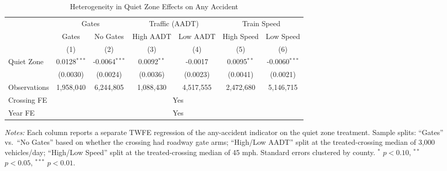 \begin{table}[t]
\centering
\caption{Heterogeneity in Quiet Zone Effects on Any Accident}
\label{tab:heterogeneity}
\begin{adjustbox}{max width=\textwidth}
\begin{tabular}{lcccccc}
\hline\hline
 & \multicolumn{2}{c}{Gates} & \multicolumn{2}{c}{Traffic (AADT)} & \multicolumn{2}{c}{Train Speed} \\
\cmidrule(lr){2-3} \cmidrule(lr){4-5} \cmidrule(lr){6-7}
 & Gates & No Gates & High AADT & Low AADT & High Speed & Low Speed \\
 & (1) & (2) & (3) & (4) & (5) & (6) \\
\hline
\addlinespace
Quiet Zone & 0.0128$^{***}$ & -0.0064$^{***}$ & 0.0092$^{**}$ & -0.0017 & 0.0095$^{**}$ & -0.0060$^{***}$ \\
 & (0.0030) & (0.0024) & (0.0036) & (0.0023) & (0.0041) & (0.0021) \\
\addlinespace
\hline
Observations & 1,958,040 & 6,244,805 & 1,088,430 & 4,517,555 & 2,472,680 & 5,146,715 \\
Crossing FE & \multicolumn{6}{c}{Yes} \\
Year FE & \multicolumn{6}{c}{Yes} \\
\hline\hline
\end{tabular}
\end{adjustbox}
\par\vspace{0.3em}
\begin{minipage}{\textwidth}
\footnotesize
\textit{Notes:} Each column reports a separate TWFE regression of the any-accident indicator on the quiet zone treatment. Sample splits: ``Gates'' vs.\ ``No Gates'' based on whether the crossing had roadway gate arms; ``High/Low AADT'' split at the treated-crossing median of 3,000 vehicles/day; ``High/Low Speed'' split at the treated-crossing median of 45 mph. Standard errors clustered by county. $^{*}$ $p < 0.10$, $^{**}$ $p < 0.05$, $^{***}$ $p < 0.01$.
\end{minipage}
\end{table}

